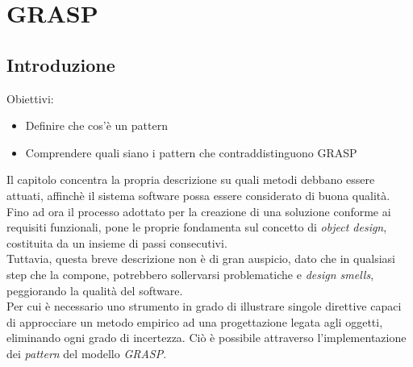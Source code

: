 \documentclass{article}
\begin{document}
\pagestyle{empty}
\section*{GRASP}
\large

\subsection*{Introduzione}
\large
Obiettivi:
\begin{itemize}
    \renewcommand{\labelitemi}{-}
    \itemsep0em
    \item Definire che cos'è un pattern
    \item Comprendere quali siano i pattern che contraddistinguono GRASP
\end{itemize}
Il capitolo concentra la propria descrizione su quali metodi debbano essere attuati, affinchè il sistema software possa essere considerato di buona qualità. Fino ad ora il processo adottato per la creazione di una soluzione conforme ai requisiti funzionali, pone le proprie fondamenta sul concetto di \textit{object design}, costituita da un insieme di passi consecutivi.\vspace*{14pt}\\
Tuttavia, questa breve descrizione non è di gran auspicio, dato che in qualsiasi step che la compone, potrebbero sollervarsi problematiche e \textit{design smells}, peggiorando la qualità del software.\vspace*{14pt}\\
Per cui è necessario uno strumento in grado di illustrare singole direttive capaci di approcciare un metodo empirico ad una progettazione legata agli oggetti, eliminando ogni grado di incertezza. Ciò è possibile attraverso l'implementazione dei \textit{pattern} del modello \textit{GRASP}.
\end{document}
